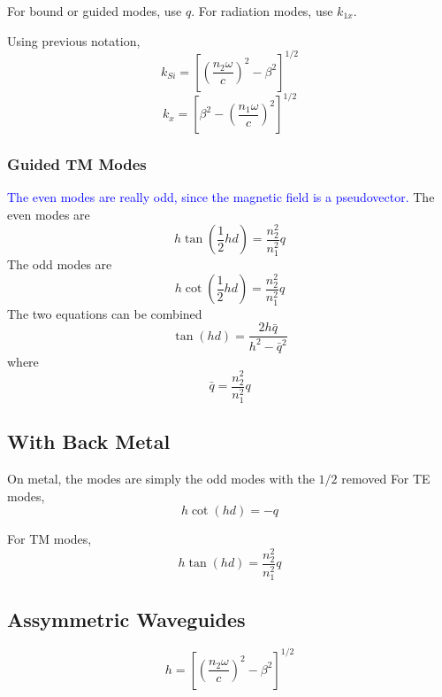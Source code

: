 \documentclass[12pt]{article}
\numberwithin{equation}{section}
\newcommand{\blue}[1]{\textcolor{blue}{#1}} %
\begin{document}
For bound or guided modes, use $q$.  
For radiation modes, use $k_{1x}$.  


Using previous notation, 
\begin{equation}
k_{Si} = \left [ \left ( \frac{n_2 \omega}{c} \right )^2 - \beta^2 \right ] ^{1/2}
\end{equation}
\begin{equation}
k_{x} = \left [ \beta^2 -  \left ( \frac{n_1 \omega}{c} \right )^2 \right ] ^{1/2}
\end{equation}


\subsubsection{Guided TM Modes}

\blue{The even modes are really odd, since the magnetic field is a pseudovector.}
The even modes are 
\begin{equation}
h \tan (\frac{1}{2} h d ) = \frac{n_2^2}{n_1^2} q
\end{equation}
The odd modes are 
\begin{equation}
h \cot (\frac{1}{2} h d ) = \frac{n_2^2}{n_1^2} q
\end{equation}
The two equations can be combined
\begin{equation}
\tan (h d) = \frac{2 h \bar{q}}{h^2 - \bar{q}^2}
\end{equation}
where 
\begin{equation}
\bar{q} = \frac{n_2^2}{n_1^2} q
\end{equation}

\subsection{With Back Metal}

On metal, the modes are simply the odd modes with the $1/2$ removed
For TE modes, 
\begin{equation}
h \cot ( h  d) = -q
\end{equation}

For TM modes, 
\begin{equation}
h \tan ( h d ) = \frac{n_2^2}{n_1^2} q
\end{equation}

\subsection{Assymmetric Waveguides}

\begin{equation}
h = \left [ \left ( \frac{n_2 \omega}{c} \right )^2 - \beta^2 \right ] ^{1/2}
\end{equation}
\end{document}
